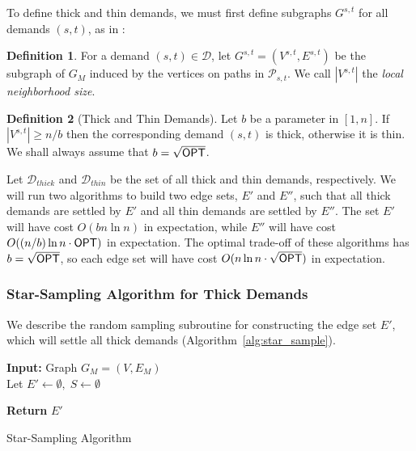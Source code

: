 \documentclass{article}
\theoremstyle{definition}
\newtheorem{definition}{Definition}
\theoremstyle{remark}
\def\opt {{\sf OPT}}
\begin{document}
To define thick and thin demands, we must first define subgraphs $G^{s,t}$ for all demands $(s,t)$, as in \cite{DK11, BBMRY11}:

\begin{definition}
    For a demand $(s,t) \in \mathcal{D}$, let $G^{s,t} = (V^{s,t}, E^{s,t})$ be the subgraph of $G_M$ induced by the vertices on paths in $\mathcal{P}_{s,t}$. We call $|V^{s,t}|$ the \textit{local neighborhood size}.
\end{definition}

\begin{definition}[Thick and Thin Demands] 
    Let $b$ be a parameter in $[1,n]$. If $|V^{s,t}| \geq n/b$ then the corresponding demand $(s,t)$ is thick, otherwise it is thin. We shall always assume that $b = \sqrt{{\opt}}$.
\end{definition}

Let $\mathcal{D}_{thick}$ and $\mathcal{D}_{thin}$ be the set of all thick and thin demands, respectively. We will run two algorithms to build two edge sets, $E'$ and $E''$, such that all thick demands are settled by $E'$ and all thin demands are settled by $E''$. The set $E'$ will have cost $O(bn\ln{n})$ in expectation, while $E''$ will have cost $O((n/b)\ln{n} \cdot {\opt})$ in expectation. The optimal trade-off of these algorithms has $b = \sqrt{\opt}$, so each edge set will have cost $O(n\ln{n} \cdot \sqrt{{\opt} })$ in expectation.

\subsubsection{Star-Sampling Algorithm for Thick Demands} \label{sec:thick}
We describe the random sampling subroutine for constructing the edge set $E'$, which will settle all thick demands (Algorithm~\ref{alg:star_sample}). 

\begin{algorithm}[h]
\DontPrintSemicolon

\textbf{Input:} 
Graph $G_M = (V, E_M)$ \\

Let $E' \gets \emptyset, \; S \gets \emptyset$  

\textbf{Return} $E'$ \;

\caption{\label{alg:star_sample} Star-Sampling Algorithm}
\end{algorithm}
\end{document}
